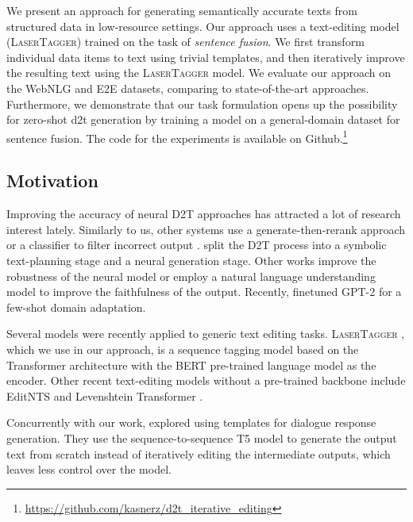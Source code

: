 We present an approach for generating semantically accurate texts from structured data in low-resource settings. Our approach uses a text-editing model (\textsc{LaserTagger}) trained on the task of \emph{sentence fusion}. We first transform individual data items to text using trivial templates, and then iteratively improve the resulting text using the \textsc{LaserTagger} model. We evaluate our approach on the WebNLG and E2E datasets, comparing to state-of-the-art approaches. Furthermore, we demonstrate that our task formulation opens up the possibility for zero-shot \ac{d2t} generation by training a model on a general-domain dataset for sentence fusion. The code for the experiments is available on Github.\footnote{\url{https://github.com/kasnerz/d2t_iterative_editing}}


\subsection{Motivation}
\label{sec:text-editing}
Improving the accuracy of neural D2T approaches has attracted a lot of research interest lately.
Similarly to us, other systems use a generate-then-rerank approach \citep{dusek_sequence--sequence_2016,juraska_deep_2018} or a classifier to filter incorrect output \citep{harkous2020have}.
\citet{moryossef2019bimproving,moryossef2019astep} %
split the D2T process into a symbolic text-planning stage and a neural generation stage. Other works improve the robustness of the neural model \citep{tian2019sticking,kedzie_good_2019} or employ a natural language understanding model \citep{nie_simple_2019} to improve the faithfulness of the output. Recently, \citet{chen-etal-2020-shot} finetuned GPT-2 \citep{radford2019language} for a few-shot domain adaptation.

Several models were recently applied to generic text editing tasks. \textsc{LaserTagger} \citep{malmi2019encode}, which we use in our approach, is a sequence tagging model based on the Transformer \citep{vaswani2017attention} architecture with the BERT \citep{devlin-etal-2019-bert} pre-trained language model as the encoder. Other recent text-editing models without a pre-trained backbone include EditNTS \citep{dong-etal-2019-editnts} and Levenshtein Transformer \citep{gu2019levenshtein}.

Concurrently with our work, \citet{kale2020few} explored using templates for dialogue response generation. %
They use the sequence-to-sequence T5 model \citep{raffel2019exploring} to generate the output text from scratch instead of iteratively editing the intermediate outputs, which leaves less control over the model.

